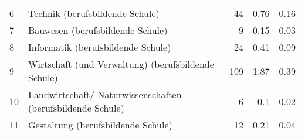 \begin{longtable}{lXrrr}
     6 &
     \multicolumn{1}{X}{ Technik (berufsbildende Schule)   } &


       \num{44} &
       \num[round-mode=places,round-precision=2]{0.76} &
         \num[round-mode=places,round-precision=2]{0.16} \\

     7 &
     \multicolumn{1}{X}{ Bauwesen (berufsbildende Schule)   } &


       \num{9} &
       \num[round-mode=places,round-precision=2]{0.15} &
         \num[round-mode=places,round-precision=2]{0.03} \\

     8 &
     \multicolumn{1}{X}{ Informatik (berufsbildende Schule)   } &


       \num{24} &
       \num[round-mode=places,round-precision=2]{0.41} &
         \num[round-mode=places,round-precision=2]{0.09} \\

     9 &
     \multicolumn{1}{X}{ Wirtschaft (und Verwaltung) (berufsbildende Schule)   } &


       \num{109} &
       \num[round-mode=places,round-precision=2]{1.87} &
         \num[round-mode=places,round-precision=2]{0.39} \\

     10 &
     \multicolumn{1}{X}{ Landwirtschaft/ Naturwissenschaften (berufsbildende Schule)   } &


       \num{6} &
       \num[round-mode=places,round-precision=2]{0.1} &
         \num[round-mode=places,round-precision=2]{0.02} \\

     11 &
     \multicolumn{1}{X}{ Gestaltung (berufsbildende Schule)   } &


       \num{12} &
       \num[round-mode=places,round-precision=2]{0.21} &
         \num[round-mode=places,round-precision=2]{0.04} \\


\end{longtable}
